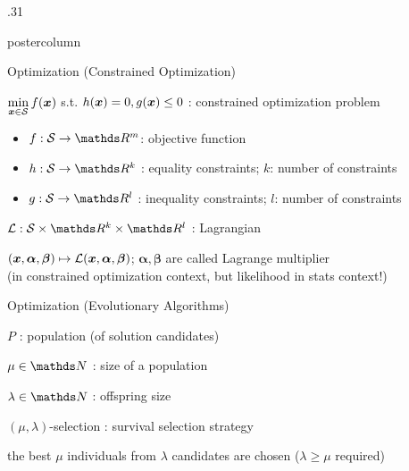 \documentclass[11pt,compress,t,notes=noshow, xcolor=table]{beamer}
\begin{document}
\begin{frame}[fragile]{}
\begin{columns}
\begin{column}{.31\textwidth}
\begin{beamercolorbox}[center]{postercolumn}
\begin{minipage}{.98\textwidth}
{\begin{myblock}{Optimization (Constrained Optimization)}
					\begin{codebox}
							$\min\limits_{\bm{x} \in \mathcal{S}} f(\bm{x})$ s.t. $h(\bm{x}) = 0, g(\bm{x}) \le 0$ : constrained optimization problem
						\end{codebox}
						\begin{itemize}
							\item \quad $f: \mathcal{S} \to \R^m$: objective function
							\item \quad $h: \mathcal{S} \to \R^k$ : equality constraints; $k$: number of constraints\\
							\item \quad $g: \mathcal{S} \to \R^l$ : inequality constraints; $l$: number of constraints
						\end{itemize} \hspace{1ex} 
						\begin{codebox}
							 $\mathcal{L}: \mathcal{S} \times \R^k \times \R^l$ : Lagrangian
						\end{codebox}
						\hspace*{1ex} $(\bm{x}, \bm{\alpha}, \bm{\beta}) \mapsto \mathcal{L}(\bm{x}, \bm{\alpha}, \bm{\beta})$; $\bm{\alpha}, \bm{\beta}$ are called Lagrange multiplier \\
						\hspace*{1ex} (in constrained optimization context, but likelihood in stats context!)
					\end{myblock}
					\begin{myblock}{Optimization (Evolutionary Algorithms)}
						\begin{codebox}
							 $P$ : population (of solution candidates)
						\end{codebox}
						\hspace*{1ex} 
						\begin{codebox}
							 $\mu \in \N$ : size of a population
						\end{codebox}
						\hspace*{1ex} 
						\begin{codebox}
							 $\lambda \in \N$ : offspring size
						\end{codebox}
						\hspace*{1ex} 
						\begin{codebox}
							 $(\mu, \lambda)$-selection : survival selection strategy
						\end{codebox}
						\hspace*{1ex} the best $\mu$ individuals from $\lambda$ candidates are chosen ($\lambda \ge \mu$ required) \\

\end{myblock}}
\end{minipage}
\end{beamercolorbox}
\end{column}
\end{columns}
\end{frame}
\end{document}
